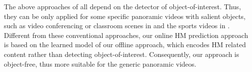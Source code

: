 \documentclass[10pt,journal,compsoc]{IEEEtran}
\begin{document}
The above approaches of \cite{foote2000flycam, sun2005region, su2016pano2vid, hu2017deep, lin2017tell}  all depend on the detector of object-of-interest. Thus, they can be only applied for some specific panoramic videos with salient objects, such as video conferencing or classroom scenes in \cite{foote2000flycam, sun2005region} and the sports videos in \cite{su2016pano2vid, hu2017deep, lin2017tell}. Different from these conventional approaches, our online HM prediction approach is based on the learned model of our offline approach, which encodes HM related content rather than detecting object-of-interest. Consequently, our approach is object-free, thus more suitable for the generic panoramic videos.






\end{document}
